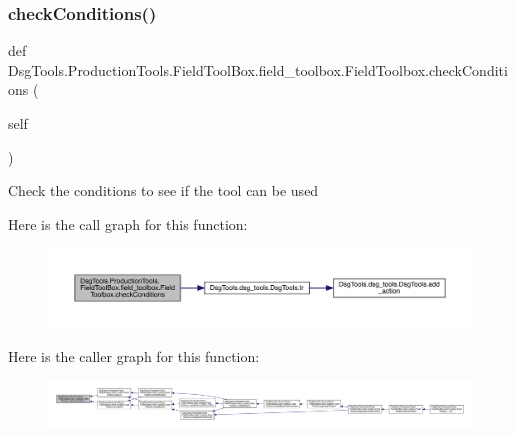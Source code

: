 \subsubsection{\texorpdfstring{check\+Conditions()}{checkConditions()}}
{\footnotesize\ttfamily def Dsg\+Tools.\+Production\+Tools.\+Field\+Tool\+Box.\+field\+\_\+toolbox.\+Field\+Toolbox.\+check\+Conditions (\begin{DoxyParamCaption}\item[{}]{self }\end{DoxyParamCaption})}

\begin{DoxyVerb}Check the conditions to see if the tool can be used
\end{DoxyVerb}
 Here is the call graph for this function\+:
\nopagebreak
\begin{figure}[H]
\begin{center}
\leavevmode
\includegraphics[width=350pt]{class_dsg_tools_1_1_production_tools_1_1_field_tool_box_1_1field__toolbox_1_1_field_toolbox_a19f0de63a76b240ecb670e16be5cc39e_cgraph}
\end{center}
\end{figure}
Here is the caller graph for this function\+:
\nopagebreak
\begin{figure}[H]
\begin{center}
\leavevmode
\includegraphics[width=350pt]{class_dsg_tools_1_1_production_tools_1_1_field_tool_box_1_1field__toolbox_1_1_field_toolbox_a19f0de63a76b240ecb670e16be5cc39e_icgraph}
\end{center}
\end{figure}
\mbox{\label{class_dsg_tools_1_1_production_tools_1_1_field_tool_box_1_1field__toolbox_1_1_field_toolbox_a0a2d77a158704eb6902759a909b06546}} 
